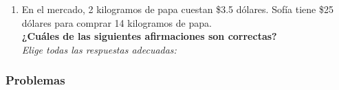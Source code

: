 \documentclass[11pt]{book}
\begin{document}
\begin{enumerate}
  \item En el mercado, 2 kilogramos de papa cuestan \$3.5 dólares.
        Sofía tiene \$25 dólares para comprar 14 kilogramos de papa.\\
        \textbf{¿Cuáles de las siguientes afirmaciones son correctas?}\\
        \emph{Elige todas las respuestas adecuadas:}\\

\end{enumerate}

\newpage
\subsubsection{Problemas}
\end{document}
